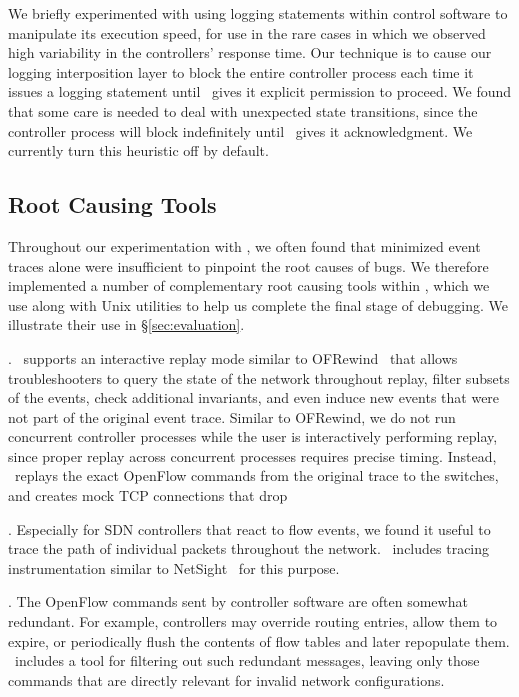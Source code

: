  We briefly experimented
with using logging statements within control software to manipulate its execution speed,
for use in the rare cases in which we observed high variability in the
controllers' response time. Our technique is to cause our logging
interposition layer to block the entire controller
process each time it issues a logging statement until \projectname~gives it
explicit permission to proceed. We found that some care is needed to deal
with unexpected state transitions, since the controller process will block
indefinitely until \projectname~gives it acknowledgment.
We currently turn this heuristic off by default.

\subsection{Root Causing Tools}
\label{subsec:root_causing}

Throughout our experimentation with \projectname, we often found that
minimized event traces alone were insufficient to
pinpoint the root causes of bugs. We therefore implemented a number of
complementary root
causing tools within \projectname,
which we use along with Unix utilities to help us complete the final
stage of debugging. We illustrate their use in \S\ref{sec:evaluation}.

. \projectname~supports an interactive replay mode
similar to OFRewind~\cite{ofrewind} that allows troubleshooters to query the
state of the network throughout replay, filter subsets of the events, check
additional invariants, and
even induce new events that were not part of the original event trace.
 Similar to OFRewind, we do not run concurrent controller processes while the
user is interactively performing replay, since proper replay across
concurrent processes requires precise timing.
Instead, \projectname~replays the exact OpenFlow commands from the
original trace to the switches, and creates mock TCP connections that drop

. Especially for SDN controllers that react to
flow events, we found it useful to trace the path of individual
packets throughout the network. \projectname~includes tracing instrumentation
similar to NetSight~\cite{ndb14} for this purpose.

. The OpenFlow commands sent by controller software
are often somewhat redundant. For example, controllers may override routing
entries, allow them to expire, or periodically flush the
contents of flow tables and later repopulate them. \projectname~includes a
tool for filtering out such redundant messages,
leaving only those commands that are directly relevant for invalid network
configurations.


